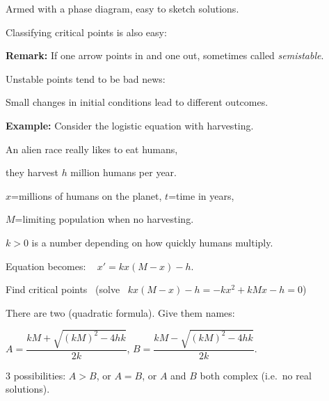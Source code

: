 \documentclass[10pt,aspectratio=169]{beamer}
\begin{document}
\begin{frame}
Armed with a phase diagram, easy to sketch solutions.

\vspace*{3.2in}

\end{frame}

\begin{frame}
Classifying critical points is also easy:

\medskip


\medskip
\pause

\textbf{Remark:} If one arrow points in and one out, sometimes called
\emph{semistable}.

\medskip
\pause

Unstable points tend to be bad news:

\pause
Small changes in initial conditions lead to different outcomes.

\end{frame}

\begin{frame}
\textbf{Example:}
Consider the logistic equation with harvesting.

\pause
An alien race really likes to eat humans,

\pause
they harvest $h$ million humans per year.

\pause

$x$=millions of humans on the planet,
\pause
$t$=time in years,

\pause
$M$=limiting population when no harvesting.

\pause
$k > 0$ is a number depending on how quickly humans multiply.

\medskip
\pause

Equation becomes: ~
$x' = kx(M-x) - h$.

\medskip
\pause

Find critical points ~(solve~
$kx(M-x) - h = -kx^2+kMx - h  = 0$)

\medskip
\pause

There are two (quadratic formula).  Give them names:

$A = \dfrac{kM + \sqrt{{(kM)}^2 - 4hk}}{2k}$, \qquad
$B = \dfrac{kM - \sqrt{{(kM)}^2 - 4hk}}{2k}$.

\pause
\medskip

$3$ possibilities:
$A > B$, or $A=B$, or $A$ and $B$ both complex
(i.e.\ no real solutions).

\end{frame}
\end{document}
